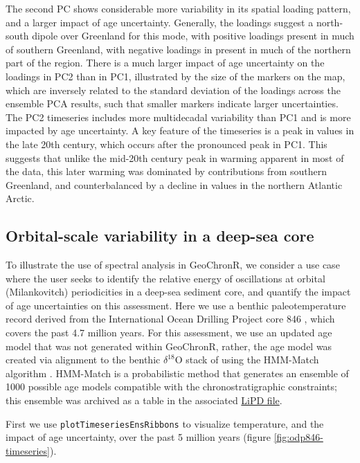 \documentclass[gchron, manuscript]{copernicus}
\begin{document}
The second PC shows considerable more variability in its spatial loading pattern, and a larger impact of age uncertainty.
Generally, the loadings suggest a north-south dipole over Greenland for this mode, with positive loadings present in much of southern Greenland, with negative loadings in present in much of the northern part of the region.
There is a much larger impact of age uncertainty on the loadings in PC2 than in PC1, illustrated by the size of the markers on the map, which are inversely related to the standard deviation of the loadings across the ensemble PCA results, such that smaller markers indicate larger uncertainties.
The PC2 timeseries includes more multidecadal variability than PC1 and is more impacted by age uncertainty.
A key feature of the timeseries is a peak in values in the late 20th century, which occurs after the pronounced peak in PC1.
This suggests that unlike the mid-20th century peak in warming apparent in most of the data, this later warming was dominated by contributions from southern Greenland, and counterbalanced by a decline in values in the northern Atlantic Arctic.

\hypertarget{sec:spec_vignette}{%
\subsection{Orbital-scale variability in a deep-sea core}\label{sec:spec_vignette}}

To illustrate the use of spectral analysis in GeoChronR, we consider a use case where the user seeks to identify the relative energy of oscillations at orbital (Milankovitch) periodicities in a deep-sea sediment core, and quantify the impact of age uncertainties on this assessment.
Here we use a benthic paleotemperature record derived from the International Ocean Drilling Project core 846 \citep{mix1995benthic, Shackleton95}, which covers the past 4.7 million years.
For this assessment, we use an updated age model that was not generated within GeoChronR, rather, the age model was created via alignment to the benthic \(\delta^{18}\mathrm{O}\) stack of \citet{LisieckiRaymo05} using the HMM-Match algorithm \citep{ProbStack, khider2017}.
HMM-Match is a probabilistic method that generates an ensemble of 1000 possible age models compatible with the chronostratigraphic constraints; this ensemble was archived as a table in the associated \href{http://lipdverse.org/geochronr-examples/ODP846.Lawrence.2006.lpd}{LiPD file}.

First we use \texttt{plotTimeseriesEnsRibbons} to visualize temperature, and the impact of age uncertainty, over the past 5 million years (figure \ref{fig:odp846-timeseries}).
\end{document}
